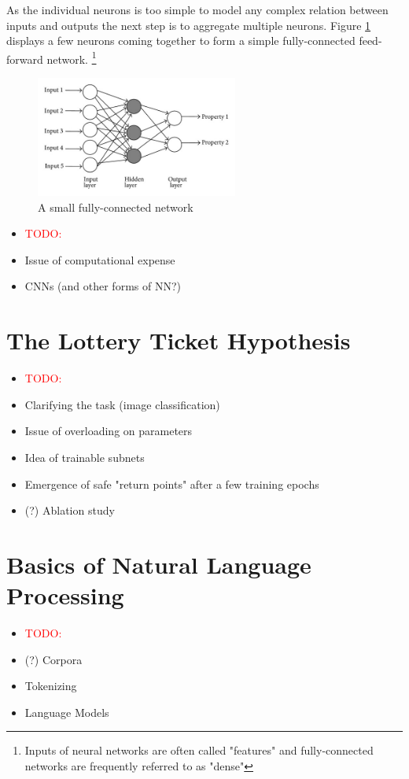 As the individual neurons is too simple to model any complex relation between inputs
and outputs the next step is to aggregate multiple neurons. Figure \ref{fig:FFNetwork} displays a few neurons coming together to form a simple fully-connected feed-forward network.
\footnote[2]{
	Inputs of neural networks are often called "features" and fully-connected networks are frequently referred to as "dense"	}
\begin{figure}
	\centering
		\includegraphics[height=150px]{gfx/Dense_FFNetwork.jpg}
		\caption{A small fully-connected network}
		\label{fig:FFNetwork}
\end{figure}

\begin{itemize}
	\item \textcolor{red}{TODO:}
	\item Issue of computational expense
	\item CNNs (and other forms of NN?)
\end{itemize}
	
\section{The Lottery Ticket Hypothesis}
\begin{itemize}
	\item \textcolor{red}{TODO:}
	\item Clarifying the task (image classification)
	\item Issue of overloading on parameters
	\item Idea of trainable subnets
	\item Emergence of safe "return points" after a few training epochs
	\item (?) Ablation study
\end{itemize}

\section{Basics of Natural Language Processing}
\begin{itemize}
	\item \textcolor{red}{TODO:}
	\item (?) Corpora
	\item Tokenizing
	\item Language Models
\end{itemize}

